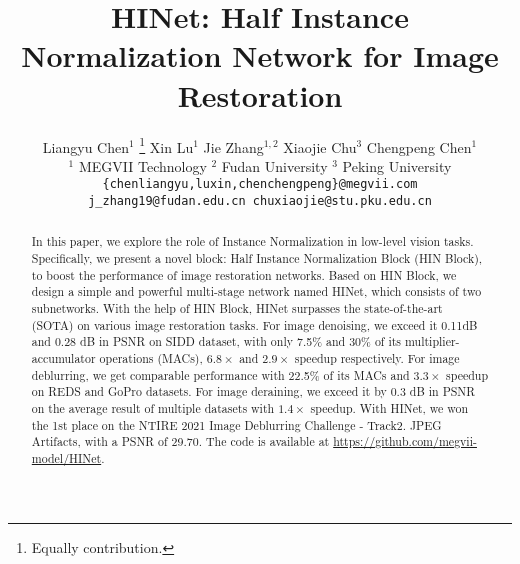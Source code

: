 \documentclass[final]{cvpr}
\begin{document}
\title{HINet: Half Instance Normalization Network for Image Restoration}

\author{Liangyu Chen$^1$ \thanks{Equally contribution.}\hspace{20pt} Xin Lu$^1$ \footnotemark[1] \hspace{20pt} Jie Zhang$^{1,2}$\hspace{20pt} Xiaojie Chu$^{3}$ \hspace{20pt} Chengpeng Chen$^1$\\ 
{$^1 $} MEGVII Technology \hspace{20pt} {$^2 $} Fudan University \hspace{20pt} {$^3 $} Peking University\\
{\tt\small \{chenliangyu,luxin,chenchengpeng\}@megvii.com}\\
{\tt\small j\_zhang19@fudan.edu.cn \hspace{20pt} chuxiaojie@stu.pku.edu.cn}\\
}
\maketitle


\begin{abstract}
   In this paper, we explore the role of Instance Normalization in low-level vision tasks. Specifically, we present a novel block: Half Instance Normalization Block (HIN Block), to boost the performance of image restoration networks. 
   Based on HIN Block, we design a simple and powerful multi-stage network named HINet, which consists of two subnetworks. With the help of HIN Block, HINet surpasses the state-of-the-art (SOTA) on various image restoration tasks. For image denoising, we exceed it 0.11dB and 0.28 dB in PSNR on SIDD dataset, with only 7.5\% and 30\% of its multiplier-accumulator operations (MACs), $6.8\times$ and $2.9\times$ speedup respectively. For image deblurring, we get comparable performance with 22.5\% of its MACs and $3.3\times$ speedup on REDS and GoPro datasets. For image deraining, we exceed it by 0.3 dB in PSNR on the average result of multiple datasets with $1.4\times$ speedup. With HINet, we won the 1st place on the NTIRE 2021 Image Deblurring Challenge - Track2. JPEG Artifacts, with a PSNR of 29.70. The code is available at \url{https://github.com/megvii-model/HINet}.
\end{abstract}

\vspace{-0.2cm}
\end{document}
